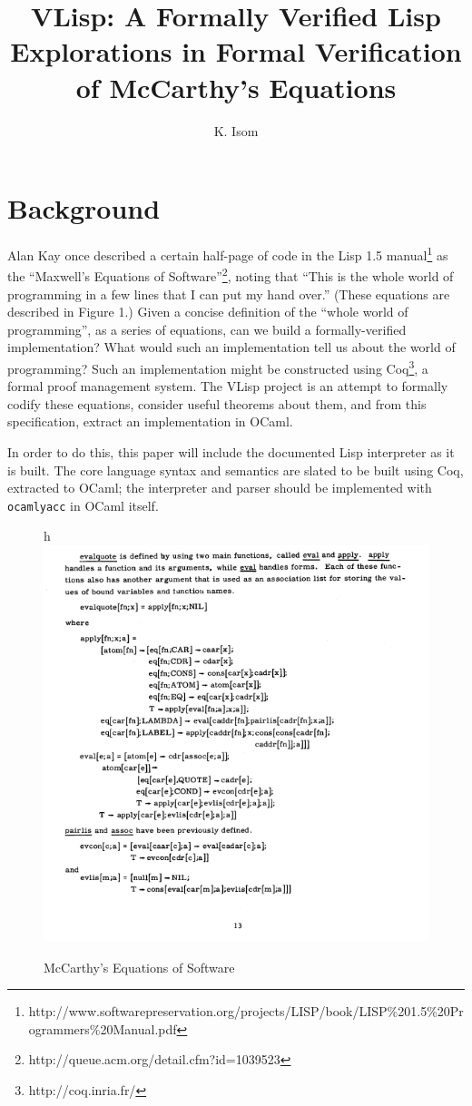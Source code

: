 \documentclass[10pt]{article}
\title {VLisp: A Formally Verified Lisp\\Explorations in Formal Verification of McCarthy's Equations}
\author{K. Isom}
\begin{document}
\maketitle

\section{Background}

Alan Kay once described a certain half-page of code in the Lisp 1.5
manual\footnote{http://www.softwarepreservation.org/projects/LISP/book/LISP\%201.5\%20Programmers\%20Manual.pdf}
as the ``Maxwell's Equations of
Software''\footnote{http://queue.acm.org/detail.cfm?id=1039523},
noting that ``This is the whole world of programming in a few lines
that I can put my hand over.'' (These equations are described in
Figure 1.) Given a concise definition of the ``whole world of
programming'', as a series of equations, can we build a
formally-verified implementation? What would such an implementation
tell us about the world of programming? Such an implementation might
be constructed using Coq\footnote{http://coq.inria.fr/}, a formal
proof management system. The VLisp project is an attempt to formally
codify these equations, consider useful theorems about them, and from
this specification, extract an implementation in OCaml.

In order to do this, this paper will include the documented Lisp
interpreter as it is built. The core language syntax and semantics are
slated to be built using Coq, extracted to OCaml; the interpreter and
parser should be implemented with \verb|ocamlyacc| in OCaml itself.

\begin{figure}{h}
\includegraphics{Lisp_Maxwells_Equations}
\caption{McCarthy's Equations of Software}
\end{figure}

\end{document}
